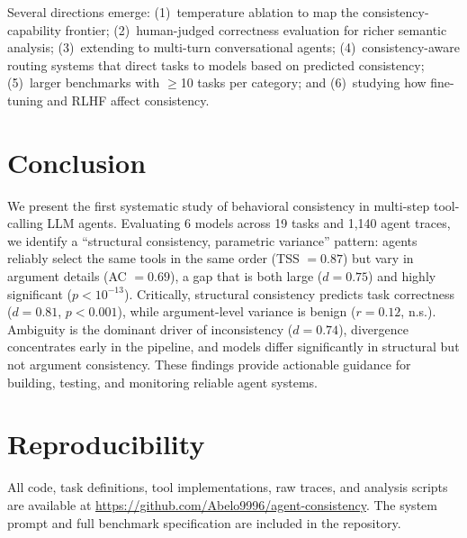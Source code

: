 \documentclass[letterpaper]{article}
\begin{document}
Several directions emerge: (1)~temperature ablation to map the consistency-capability frontier; (2)~human-judged correctness evaluation for richer semantic analysis; (3)~extending to multi-turn conversational agents; (4)~consistency-aware routing systems that direct tasks to models based on predicted consistency; (5)~larger benchmarks with $\geq$10 tasks per category; and (6)~studying how fine-tuning and RLHF affect consistency.

\section{Conclusion}

We present the first systematic study of behavioral consistency in multi-step tool-calling LLM agents. Evaluating 6 models across 19 tasks and 1,140 agent traces, we identify a ``structural consistency, parametric variance'' pattern: agents reliably select the same tools in the same order (TSS $= 0.87$) but vary in argument details (AC $= 0.69$), a gap that is both large ($d = 0.75$) and highly significant ($p < 10^{-13}$). Critically, structural consistency predicts task correctness ($d = 0.81$, $p < 0.001$), while argument-level variance is benign ($r = 0.12$, n.s.). Ambiguity is the dominant driver of inconsistency ($d = 0.74$), divergence concentrates early in the pipeline, and models differ significantly in structural but not argument consistency. These findings provide actionable guidance for building, testing, and monitoring reliable agent systems.

\section*{Reproducibility}

All code, task definitions, tool implementations, raw traces, and analysis scripts are available at \url{https://github.com/Abelo9996/agent-consistency}. The system prompt and full benchmark specification are included in the repository.
\end{document}

